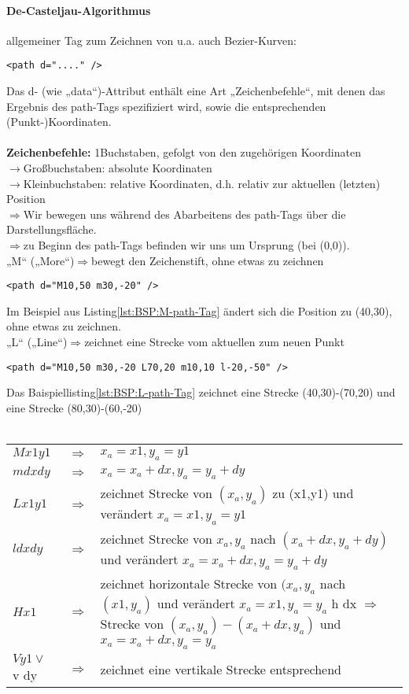 \paragraph{De-Casteljau-Algorithmus}
allgemeiner Tag zum Zeichnen von u.a. auch Bezier-Kurven:
\begin{lstlisting}[caption={Path-Tag}, label={lst:path-Tag}, language={SVG}]
  <path d="...." />
\end{lstlisting}
Das d- (wie „data“)-Attribut enthält eine Art „Zeichenbefehle“, mit denen das Ergebnis des path-Tags spezifiziert wird, sowie die entsprechenden (Punkt-)Koordinaten.\\
\\
\textbf{Zeichenbefehle:} 1Buchstaben, gefolgt von den zugehörigen Koordinaten\\
$\rightarrow$Großbuchstaben: absolute Koordinaten\\
$\rightarrow$Kleinbuchstaben: relative Koordinaten, d.h. relativ zur aktuellen (letzten) Position\\
$\Rightarrow$Wir bewegen uns während des Abarbeitens des path-Tags über die Darstellungsfläche.\\
$\Rightarrow$zu Beginn des path-Tags befinden wir uns um Ursprung (bei (0,0)).\\
„M“ („More“)$\Rightarrow$bewegt den Zeichenstift, ohne etwas zu zeichnen\\
\begin{lstlisting}[caption={Beispiel für "M" im Path-Tag}, label={lst:BSP:M-path-Tag}, language={SVG}]
  <path d="M10,50 m30,-20" />
\end{lstlisting}
Im Beispiel aus Listing\vref{lst:BSP:M-path-Tag} ändert sich die Position zu (40,30), ohne etwas zu zeichnen.\\
„L“ („Line“)$\Rightarrow$zeichnet eine Strecke vom aktuellen zum neuen Punkt
\begin{lstlisting}[caption={Beispiel für "L" im Path-Tag}, label={lst:BSP:L-path-Tag}, language={SVG}]
  <path d="M10,50 m30,-20 L70,20 m10,10 l-20,-50" />
\end{lstlisting}
Das Baispiellisting\vref{lst:BSP:L-path-Tag} zeichnet eine Strecke (40,30)-(70,20) und eine Strecke (80,30)-(60,-20)\\
\\
\begin{tabularx}{\textwidth}{lcX}
$M x1 y1$ & $\Rightarrow$ & $x_{a}=x1, y_{a}=y1$\\
$m dx dy$ & $\Rightarrow$ & $x_{a}=x_{a}+dx, y_{a}=y_{a}+dy$\\
$L x1 y1$ & $\Rightarrow$ & zeichnet Strecke von $(x_{a},y_{a})$ zu (x1,y1) und verändert $x_{a}=x1, y_{a}=y1$\\
$l dx dy$ & $\Rightarrow$ & zeichnet Strecke von $x_{a},y_{a}$ nach $(x_{a}+dx, y_{a}+dy)$ und verändert $x_{a}=x_{a}+dx,y_{a}=y_{a}+dy$\\
$H x1$ & $\Rightarrow$ & zeichnet horizontale Strecke von $(x_{a},y_{a}$ nach $(x1,y_{a})$ und verändert $x_{a}=x1,y_{a}=y_{a}$
h dx $\Rightarrow$Strecke von $(x_{a},y_{a})-(x_{a}+dx,y_{a})$ und $x_{a}=x_{a}+dx,y_{a}=y_{a}$\\
$V y1 \vee$ v dy & $\Rightarrow$ & zeichnet eine vertikale Strecke entsprechend\\
\end{tabularx}
